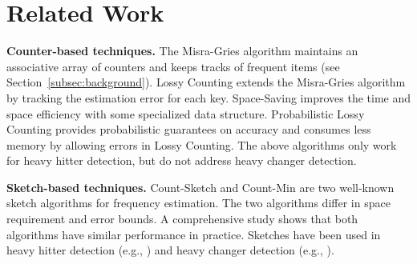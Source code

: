 \section{Related Work}
\label{sec:related}


{\bf Counter-based techniques.}
The Misra-Gries algorithm \cite{Misra1982} maintains an associative array of
counters and keeps tracks of frequent items (see
Section~\ref{subsec:background}).
Lossy Counting \cite{Manku2002} extends the Misra-Gries algorithm by tracking
the estimation error for each key.  Space-Saving \cite{Metwally2005} improves
the time and space efficiency with some specialized data structure.
Probabilistic Lossy Counting \cite{Dimitropoulos2008}
provides probabilistic guarantees on accuracy and consumes less memory by
allowing errors in Lossy Counting.  The above algorithms only work for heavy
hitter detection, but do not address heavy changer detection.  

{\bf Sketch-based techniques.} 
Count-Sketch \cite{Charikar2004,Cormode2012} and Count-Min \cite{Cormode2005a}
are two well-known sketch algorithms for frequency estimation.
The two algorithms differ in space requirement and error bounds.
A comprehensive study \cite{Cormode2010} shows that both algorithms have
similar performance in practice.  Sketches have been used in heavy hitter
detection (e.g., \cite{Estan2003}) and heavy changer detection (e.g.,
\cite{Krishnamurthy2003}).  

